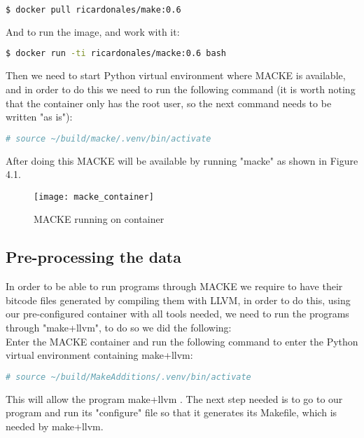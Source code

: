 \begin{lstlisting}[language=bash]
$ docker pull ricardonales/make:0.6
\end{lstlisting}

And to run the image, and work with it:

\begin{lstlisting}[language=bash]
$ docker run -ti ricardonales/macke:0.6 bash
\end{lstlisting}

Then we need to start Python virtual environment where MACKE is available, and in order to do this we need to run the following command (it is worth noting that the container only has the root user, so the next command needs to be written "as is"):

\begin{lstlisting}[language=bash]
# source ~/build/macke/.venv/bin/activate
\end{lstlisting}

After doing this MACKE will be available by running "macke" as shown in Figure 4.1.

\begin{figure}[H]
	\caption{MACKE running on container}
	\centering
	\texttt{[image: macke\_container]}
\end{figure}


\subsection{Pre-processing the data}

In order to be able to run programs through MACKE we require to have their bitcode files generated by compiling them with LLVM, in order to do this, using our pre-configured container with all tools needed, we need to run the programs through "make+llvm", to do so we did the following:
\\

Enter the MACKE container and run the following command to enter the Python virtual environment containing make+llvm:

\begin{lstlisting}[language=bash]
# source ~/build/MakeAdditions/.venv/bin/activate
\end{lstlisting}

This will allow the program make+llvm \parencite{thomasThesis}. The next step needed is to go to our program and run its "configure" file so that it generates its Makefile, which is needed by make+llvm.

